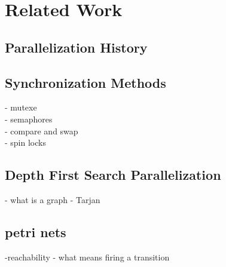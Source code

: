 \chapter{Related Work}

\section{Parallelization History}
\section{Synchronization Methods}
- mutexe\\
- semaphores\\
- compare and swap\\
- spin locks\\
\section{Depth First Search Parallelization}
- what is a graph
- Tarjan

\section{petri nets}
-reachability
- what means firing a transition


